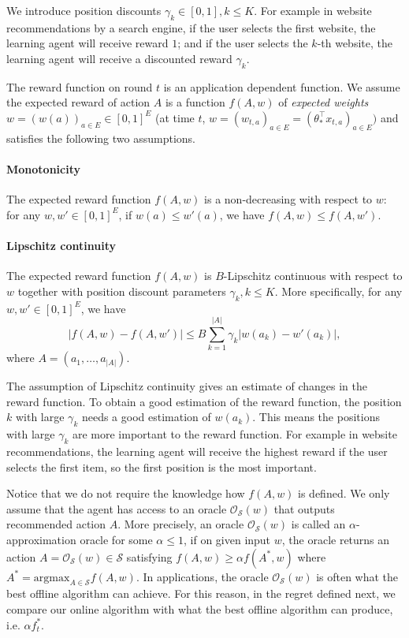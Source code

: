 \documentclass{article}
\newcommand{\cO}{\mathcal{O}}
\newcommand{\cS}{\mathcal{S}}
\newcommand{\argmax}{\mathrm{argmax}}
\begin{document}
We introduce position discounts $\gamma_k \in [0,1], k\leq K$. For example in website recommendations by a search engine, if the user selects the first website, the learning agent will receive reward $1$; and if the user selects the $k$-th website, the learning agent will receive a discounted reward $\gamma_k$.

The reward function on round $t$ is an application dependent function. We assume the expected reward of action $A$ is a function $f(A,w)$ of {\it expected weights} $w = (w(a))_{a \in E} \in [0,1]^{E}$ (at time $t$, $w = (w_{t,a})_{a \in E} = (\theta_{\ast}^{\top}x_{t,a})_{a \in E}) $ and satisfies the following two assumptions.

\paragraph{Monotonicity}
The expected reward function $f(A, w)$ is a non-decreasing with respect to $w$: for any $w,w'\in [0,1]^E$, if $w(a) \leq w'(a)$, we have $f(A, w) \leq f(A, w')$.

\paragraph{Lipschitz continuity}
The expected reward function $f(A, w)$ is $B$-Lipschitz continuous with respect to $w$ together with position discount parameters $\gamma_k, k\leq K$. More specifically, for any $w,w' \in [0,1]^E$, we have
$$
	|f(A, w) - f(A, w')| \leq B \sum_{k=1}^{|A|} \gamma_k |w(a_k) - w'(a_k)|,
$$
where $A = (a_1, \ldots, a_{|A|})$.

The assumption of Lipschitz continuity gives an estimate of changes in the reward function. To obtain a good estimation of the reward function, the position $k$ with large $\gamma_k$ needs a good estimation of $w(a_k)$. This means the positions with large $\gamma_k$ are more important to the reward function. For example in website recommendations, the learning agent will receive the highest reward if the user selects the first item, so the first position is the most important. 

Notice that we do not require the knowledge how $f(A, w)$ is defined. We only assume that the agent has access to an oracle $\cO_{\cS}(w)$ that outputs recommended action $A$. More precisely, an oracle $\cO_{\cS}(w)$ is called an $\alpha$-approximation oracle for some $\alpha \leq 1$, if on given input $w$, the oracle returns an action $A = \cO_{\cS}(w) \in \cS$ satisfying $f(A,w) \geq \alpha f(A^*,w)$ where $A^* = \argmax_{A\in\cS} f(A, w)$. In applications, the oracle $\cO_{\cS}(w)$ is often what the best offline algorithm can achieve. For this reason, in the regret defined next, we compare our online algorithm with what the best offline algorithm can produce, i.e. $\alpha f_t^{\ast}$.
\end{document}
